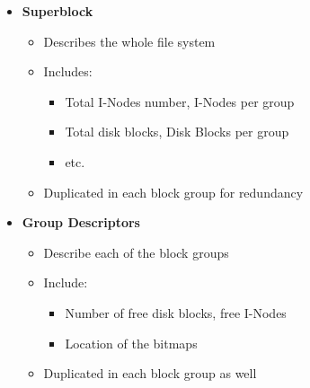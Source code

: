 \documentclass[8pt,twocolumn]{article}
\begin{document}
\begin{itemize}
  \small
  \setlength{\itemsep}{0pt} %
  \setlength{\parskip}{0pt}
  \item \textbf{Superblock}
\vspace{-0.6em}
  \begin{itemize}
    \setlength{\itemsep}{0pt} %
    \setlength{\parskip}{0pt}
      \item Describes the whole file system
      \item Includes:
      \begin{itemize}
        \setlength{\itemsep}{0pt} %
        \setlength{\parskip}{0pt}
          \item Total I-Nodes number, I-Nodes per group
          \item Total disk blocks, Disk Blocks per group
          \item etc.
      \end{itemize}
      \item Duplicated in each block group for redundancy
  \end{itemize}
\vspace{-0.6em}
  \item \textbf{Group Descriptors}
  \vspace{-0.6em}
  \begin{itemize}
    \setlength{\itemsep}{0pt} %
    \setlength{\parskip}{0pt}
      \item Describe each of the block groups
      \item Include:
      \begin{itemize}
        \setlength{\itemsep}{0pt} %
        \setlength{\parskip}{0pt}
          \item Number of free disk blocks, free I-Nodes
          \item Location of the bitmaps
      \end{itemize}
\vspace{-0.6em}
      \item Duplicated in each block group as well
  \end{itemize}
\end{itemize}
\vspace{-0.6em}
\end{document}
